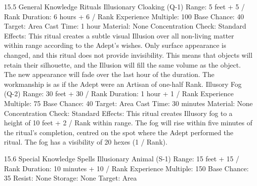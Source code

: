\documentclass[a4paper]{article}
\begin{document}
\begin{multicols}{3}
15.5 General Knowledge Rituals
Illusionary Cloaking (Q-1)
Range: 5 feet + 5 / Rank
Duration: 6 hours + 6 / Rank
Experience Multiple: 100
Base Chance: 40%
Target: Area
Cast Time: 1 hour
Material: None
Concentration Check: Standard
Effects: This ritual creates a subtle visual Illusion
over all non-living matter within range according
to the Adept’s wishes. Only surface appearance is
changed, and this ritual does not provide invisibility. This means that objects will retain their silhouette, and the Illusion will fill the same volume as
the object. The new appearance will fade over the
last hour of the duration. The workmanship is as if
the Adept were an Artisan of one-half Rank.
Illusory Fog (Q-2)
Range: 30 feet + 30 / Rank
Duration: 1 hour + 1 / Rank
Experience Multiple: 75
Base Chance: 40%
Target: Area
Cast Time: 30 minutes
Material: None
Concentration Check: Standard
Effects: This ritual creates Illusory fog to a height
of 10 feet + 2 / Rank within range. The fog will
rise within five minutes of the ritual’s completion,
centred on the spot where the Adept performed the
ritual. The fog has a visibility of 20 hexes (1 /
Rank).

15.6 Special Knowledge Spells
Illusionary Animal (S-1)
Range: 15 feet + 15 / Rank
Duration: 10 minutes + 10 / Rank
Experience Multiple: 150
Base Chance: 35%
Resist: None
Storage: None
Target: Area


\end{multicols}
\end{document}

